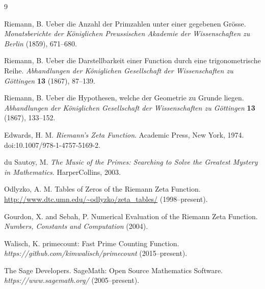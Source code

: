 \documentclass[11pt]{amsart}
\theoremstyle{definition}
\begin{document}
\begin{thebibliography}{9}

Riemann, B.
Ueber die Anzahl der Primzahlen unter einer gegebenen Grösse.
\textit{Monatsberichte der Königlichen Preussischen Akademie der Wissenschaften zu Berlin} (1859), 671--680.

Riemann, B.
Ueber die Darstellbarkeit einer Function durch eine trigonometrische Reihe.
\textit{Abhandlungen der Königlichen Gesellschaft der Wissenschaften zu Göttingen} \textbf{13} (1867), 87--139.

Riemann, B.
Ueber die Hypothesen, welche der Geometrie zu Grunde liegen.
\textit{Abhandlungen der Königlichen Gesellschaft der Wissenschaften zu Göttingen} \textbf{13} (1867), 133--152.

Edwards, H. M.
\textit{Riemann's Zeta Function}.
Academic Press, New York, 1974.
doi:10.1007/978-1-4757-5169-2.

du Sautoy, M.
\textit{The Music of the Primes: Searching to Solve the Greatest Mystery in Mathematics}.
HarperCollins, 2003.

Odlyzko, A. M.
Tables of Zeros of the Riemann Zeta Function.
\url{http://www.dtc.umn.edu/~odlyzko/zeta_tables/} (1998--present).

Gourdon, X. and Sebah, P.
Numerical Evaluation of the Riemann Zeta Function.
\textit{Numbers, Constants and Computation} (2004).

Walisch, K.
primecount: Fast Prime Counting Function.
\textit{https://github.com/kimwalisch/primecount} (2015--present).

The Sage Developers.
SageMath: Open Source Mathematics Software.
\textit{https://www.sagemath.org/} (2005--present).

\end{thebibliography}
\end{document}

